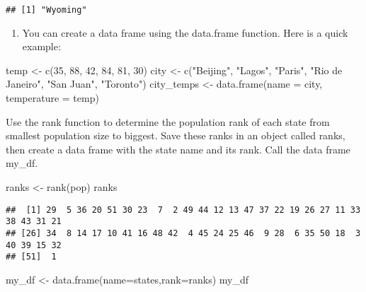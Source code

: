 \documentclass[
]{article}
\newenvironment{Shaded}{\begin{snugshade}}{\end{snugshade}}
\newcommand{\AttributeTok}[1]{\textcolor[rgb]{0.77,0.63,0.00}{#1}}
\newcommand{\DecValTok}[1]{\textcolor[rgb]{0.00,0.00,0.81}{#1}}
\newcommand{\FunctionTok}[1]{\textcolor[rgb]{0.00,0.00,0.00}{#1}}
\newcommand{\NormalTok}[1]{#1}
\newcommand{\OtherTok}[1]{\textcolor[rgb]{0.56,0.35,0.01}{#1}}
\newcommand{\StringTok}[1]{\textcolor[rgb]{0.31,0.60,0.02}{#1}}
\providecommand{\tightlist}{%
  \setlength{\itemsep}{0pt}\setlength{\parskip}{0pt}}
\begin{document}
\begin{verbatim}
## [1] "Wyoming"
\end{verbatim}

\begin{enumerate}
\def\labelenumi{\arabic{enumi}.}
\setcounter{enumi}{4}
\tightlist
\item
  You can create a data frame using the data.frame function. Here is a
  quick example:
\end{enumerate}

\begin{Shaded}
\begin{Highlighting}[]
\NormalTok{temp }\OtherTok{\textless{}{-}} \FunctionTok{c}\NormalTok{(}\DecValTok{35}\NormalTok{, }\DecValTok{88}\NormalTok{, }\DecValTok{42}\NormalTok{, }\DecValTok{84}\NormalTok{, }\DecValTok{81}\NormalTok{, }\DecValTok{30}\NormalTok{)}
\NormalTok{city }\OtherTok{\textless{}{-}} \FunctionTok{c}\NormalTok{(}\StringTok{"Beijing"}\NormalTok{, }\StringTok{"Lagos"}\NormalTok{, }\StringTok{"Paris"}\NormalTok{, }\StringTok{"Rio de Janeiro"}\NormalTok{, }
          \StringTok{"San Juan"}\NormalTok{, }\StringTok{"Toronto"}\NormalTok{)}
\NormalTok{city\_temps }\OtherTok{\textless{}{-}} \FunctionTok{data.frame}\NormalTok{(}\AttributeTok{name =}\NormalTok{ city, }\AttributeTok{temperature =}\NormalTok{ temp)}
\end{Highlighting}
\end{Shaded}

Use the rank function to determine the population rank of each state
from smallest population size to biggest. Save these ranks in an object
called ranks, then create a data frame with the state name and its rank.
Call the data frame my\_df.

\begin{Shaded}
\begin{Highlighting}[]
\NormalTok{ranks }\OtherTok{\textless{}{-}} \FunctionTok{rank}\NormalTok{(pop)}
\NormalTok{ranks}
\end{Highlighting}
\end{Shaded}

\begin{verbatim}
##  [1] 29  5 36 20 51 30 23  7  2 49 44 12 13 47 37 22 19 26 27 11 33 38 43 31 21
## [26] 34  8 14 17 10 41 16 48 42  4 45 24 25 46  9 28  6 35 50 18  3 40 39 15 32
## [51]  1
\end{verbatim}

\begin{Shaded}
\begin{Highlighting}[]
\NormalTok{my\_df }\OtherTok{\textless{}{-}} \FunctionTok{data.frame}\NormalTok{(}\AttributeTok{name=}\NormalTok{states,}\AttributeTok{rank=}\NormalTok{ranks)}
\NormalTok{my\_df}
\end{Highlighting}
\end{Shaded}
\end{document}
